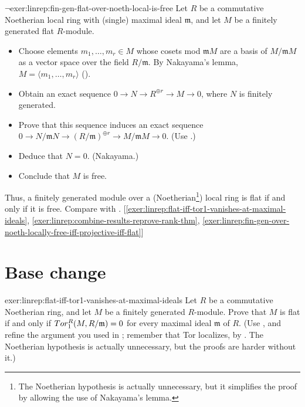\begin{exer}{$\lnot$}{exer:linrep:fin-gen-flat-over-noeth-local-is-free}
  Let $R$ be a commutative Noetherian local ring with (single) maximal
  ideal $\mathfrak{m}$, and let $M$ be a finitely generated flat
  $R$-module.
  \begin{itemize}
  \item Choose elements $m_1, \dots, m_r \in M$ whose cosets mod
    $\mathfrak{m}M$ are a basis of $M/\mathfrak{m}M$ as a vector space
    over the field $R/\mathfrak{m}$. By Nakayama's lemma,
    $M = \langle m_1, \dots, m_r \rangle$
    ().
  \item Obtain an exact sequence
    $0 \to N \to R^{\oplus r} \to M \to 0$, where $N$ is finitely
    generated.
  \item Prove that this sequence induces an exact sequence
    $0 \to N/\mathfrak{m}N \to (R/\mathfrak{m})^{\oplus r} \to
    M/\mathfrak{m}M \to 0$. (Use
    .)
  \item Deduce that $N = 0$. (Nakayama.)
  \item Conclude that $M$ is free.
  \end{itemize}
  Thus, a finitely generated module over a (Noetherian\footnote{The
    Noetherian hypothesis is actually unnecessary, but it simplifies
    the proof by allowing the use of Nakayama's lemma.}) local ring is
  flat if and only if it is free. Compare with
  .
  [\ref{exer:linrep:flat-iff-tor1-vanishes-at-maximal-ideals},
  \ref{exer:linrep:combine-results-reprove-rank-thm},
  \ref{exer:linrep:fin-gen-over-noeth-locally-free-iff-projective-iff-flat}]
\end{exer}

\section{Base change}
\label{sec:linrep:base-change}


\begin{exer}{}{exer:linrep:flat-iff-tor1-vanishes-at-maximal-ideals}
  Let $R$ be a commutative Noetherian ring, and let $M$ be a finitely
  generated $R$-module. Prove that $M$ is flat if and only if
  $Tor^R_1(M, R/\mathfrak{m}) = 0$ for every maximal ideal
  $\mathfrak{m}$ of $R$. (Use
  , and refine the
  argument you used in
  ; remember
  that Tor localizes, by
  . The Noetherian
  hypothesis is actually unnecessary, but the proofs are harder
  without it.)
\end{exer}

